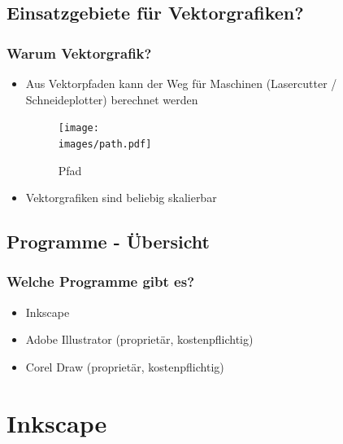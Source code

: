 \documentclass[german]{beamer} %
\newcommand{\images}{vektorzeichnen/}
\begin{document}

\subsection{Einsatzgebiete für Vektorgrafiken?}
\begin{frame}
  \frametitle{Warum Vektorgrafik?}
  
  \begin{itemize}
	  \item Aus Vektorpfaden kann der Weg für Maschinen (Lasercutter / Schneideplotter) berechnet werden
	  		\begin{minipage}{\linewidth}
	  		  \begin{figure}
	  		  	\centering
	  		    \texttt{[image: \\images/path.pdf]}
	  		    \caption{Pfad}
	  		    \label{fig:path}
	  		  \end{figure}
	  		\end{minipage}
	  \item Vektorgrafiken sind beliebig skalierbar
  \end{itemize}

  
 \end{frame}


\subsection{Programme - Übersicht}
\begin{frame}
  \frametitle{Welche Programme gibt es?}
  
  \begin{itemize}
  	\item Inkscape
  	\item Adobe Illustrator (proprietär, kostenpflichtig)
  	\item Corel Draw (proprietär, kostenpflichtig)
  \end{itemize}
  
 \end{frame}


\section{Inkscape}
\end{document}
